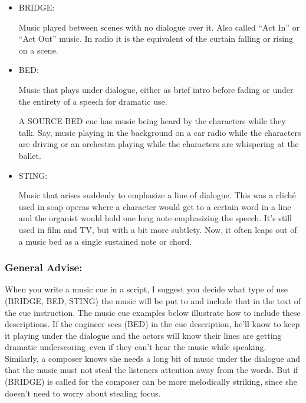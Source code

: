 \documentclass[openleft,oneside,showtrims]{memoir}
\begin{document}
\begin{itemize}
\item BRIDGE:
\label{sec:org2fc921e}

Music played between scenes with no dialogue over it. Also called ``Act In'' or ``Act Out'' music. In radio it is the equivalent of the curtain falling or rising on a scene.

\item BED:
\label{sec:org4ca2997}

Music that plays under dialogue, either as brief intro before fading or under the entirety of a speech for dramatic use. 

A SOURCE BED cue has music being heard by the characters while they talk. Say, music playing in the background on a car radio while the characters are driving or an orchestra playing while the characters are whispering at the ballet.

\item STING:
\label{sec:orgffa8bf6}

Music that arises suddenly to emphasize a line of dialogue. This was a cliché used in soap operas where a character would get to a certain word in a line and the organist would hold one long note emphasizing the speech. It's still used in film and TV, but with a bit more subtlety. Now, it often leaps out of a music bed as a single sustained note or chord.
\end{itemize}

\subsubsection*{General Advise:}
\label{sec:org2cab7d4}

When you write a music cue in a script, I suggest you decide what type of use (BRIDGE, BED, STING) the music will be put to and include that in the text of the cue instruction. The music cue examples below illustrate how to include these descriptions. If the engineer sees (BED) in the cue description, he'll know to keep it playing under the dialogue and the actors will know their lines are getting dramatic underscoring--even if they can't hear the music while speaking. Similarly, a composer knows she needs a long bit of music under the dialogue and that the music must not steal the listeners attention away from the words. But if (BRIDGE) is called for the composer can be more melodically striking, since she doesn't need to worry about stealing focus.
\end{document}
